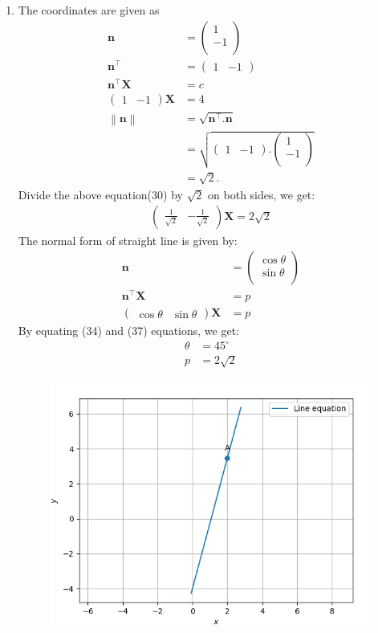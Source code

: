 \documentclass[12pt]{article}
\providecommand{\norm}[1]{\left\lVert#1\right\rVert}
\newcommand{\myvec}[1]{\ensuremath{\begin{pmatrix}#1\end{pmatrix}}}
\let\vec\mathbf
\begin{document}
\begin{enumerate}
	
\item The coordinates are given as
	\begin{align}
	\vec{n}&=\myvec{1\\-1\\}\\
	\vec{n}^\top&=\myvec{1 & -1}\\
	\vec{n}^\top \vec{X}&= c\\
	\myvec{1 & -1} \vec{X}&=4\\
	\norm{\vec{n}}&=\sqrt{\vec{n}^\top.\vec{n}}\\&=\sqrt{\myvec{1&-1}.\myvec{1\\-1\\}}\\&=\sqrt{2}.	
\end{align}	
	Divide the above equation(30) by $\sqrt{2}$ on both sides, we get: 
	\begin{align}
	\myvec{\frac{1}{\sqrt{2}} & -\frac{1}{\sqrt{2}}}\vec{X}=2\sqrt{2}
	\end{align}
	The normal form of straight line is given by:
	\begin{align}
	\vec{n}&=\myvec{\cos \theta\\\sin\theta\\}\\
	\vec{n}^\top \vec{X}&= p\\
	\myvec{\cos\theta & \sin\theta}\vec{X}&=p
	\end{align}
	By equating (34) and (37) equations, we get:
	\begin{align}
	\theta&=45^\circ\\
	p&=2\sqrt{2}
	\end{align}

\begin{figure}[!h]
	\begin{center} 
	    \includegraphics[width=\columnwidth]{./figs/line.png}
	\end{center}
\caption{}
\label{fig:Fig}
\end{figure}
\end{enumerate}
\end{document}
